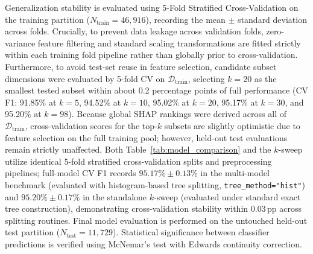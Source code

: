 Generalization stability is evaluated using 5-Fold Stratified Cross-Validation on the training partition ($N_{\text{train}} = 46,916$), recording the mean $\pm$ standard deviation across folds. Crucially, to prevent data leakage across validation folds, zero-variance feature filtering and standard scaling transformations are fitted strictly within each training fold pipeline rather than globally prior to cross-validation. Furthermore, to avoid test-set reuse in feature selection, candidate subset dimensions were evaluated by 5-fold CV on $\mathcal{D}_{\text{train}}$, selecting $k=20$ as the smallest tested subset within about 0.2 percentage points of full performance (CV F1: 91.85\% at $k=5$, 94.52\% at $k=10$, 95.02\% at $k=20$, 95.17\% at $k=30$, and 95.20\% at $k=98$). Because global SHAP rankings were derived across all of $\mathcal{D}_{\text{train}}$, cross-validation scores for the top-$k$ subsets are slightly optimistic due to feature selection on the full training pool; however, held-out test evaluations remain strictly unaffected. Both Table~\ref{tab:model_comparison} and the $k$-sweep utilize identical 5-fold stratified cross-validation splits and preprocessing pipelines; full-model CV F1 records $95.17\% \pm 0.13\%$ in the multi-model benchmark (evaluated with histogram-based tree splitting, \texttt{tree\_method="hist"}) and $95.20\% \pm 0.17\%$ in the standalone $k$-sweep (evaluated under standard exact tree construction), demonstrating cross-validation stability within 0.03\,pp across splitting routines. Final model evaluation is performed on the untouched held-out test partition ($N_{\text{test}} = 11,729$). Statistical significance between classifier predictions is verified using McNemar's test with Edwards continuity correction.

